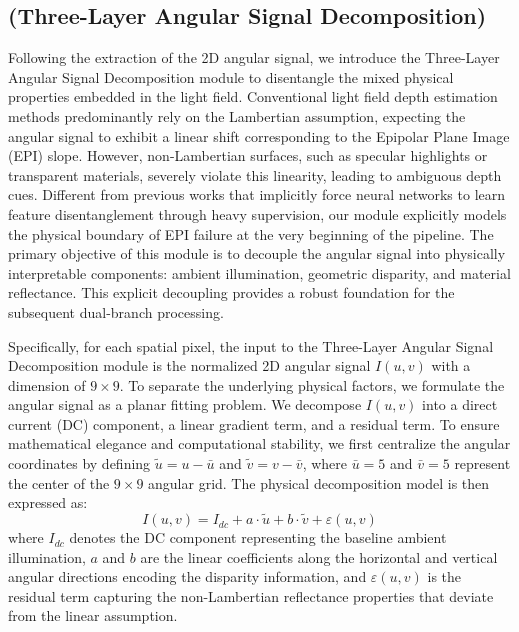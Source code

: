 \subsection{(Three-Layer Angular Signal Decomposition)}

Following the extraction of the 2D angular signal, we introduce the Three-Layer Angular Signal Decomposition module to disentangle the mixed physical properties embedded in the light field. Conventional light field depth estimation methods predominantly rely on the Lambertian assumption, expecting the angular signal to exhibit a linear shift corresponding to the Epipolar Plane Image (EPI) slope. However, non-Lambertian surfaces, such as specular highlights or transparent materials, severely violate this linearity, leading to ambiguous depth cues. Different from previous works that implicitly force neural networks to learn feature disentanglement through heavy supervision, our module explicitly models the physical boundary of EPI failure at the very beginning of the pipeline. The primary objective of this module is to decouple the angular signal into physically interpretable components: ambient illumination, geometric disparity, and material reflectance. This explicit decoupling provides a robust foundation for the subsequent dual-branch processing.

Specifically, for each spatial pixel, the input to the Three-Layer Angular Signal Decomposition module is the normalized 2D angular signal $I(u,v)$ with a dimension of $9 \times 9$. To separate the underlying physical factors, we formulate the angular signal as a planar fitting problem. We decompose $I(u,v)$ into a direct current (DC) component, a linear gradient term, and a residual term. To ensure mathematical elegance and computational stability, we first centralize the angular coordinates by defining $\tilde{u} = u - \bar{u}$ and $\tilde{v} = v - \bar{v}$, where $\bar{u} = 5$ and $\bar{v} = 5$ represent the center of the $9 \times 9$ angular grid. The physical decomposition model is then expressed as:
\begin{equation}
\label{eq:eq3}
I(u,v) = I_{dc} + a \cdot \tilde{u} + b \cdot \tilde{v} + \varepsilon(u,v)
\end{equation}
where $I_{dc}$ denotes the DC component representing the baseline ambient illumination, $a$ and $b$ are the linear coefficients along the horizontal and vertical angular directions encoding the disparity information, and $\varepsilon(u,v)$ is the residual term capturing the non-Lambertian reflectance properties that deviate from the linear assumption.

